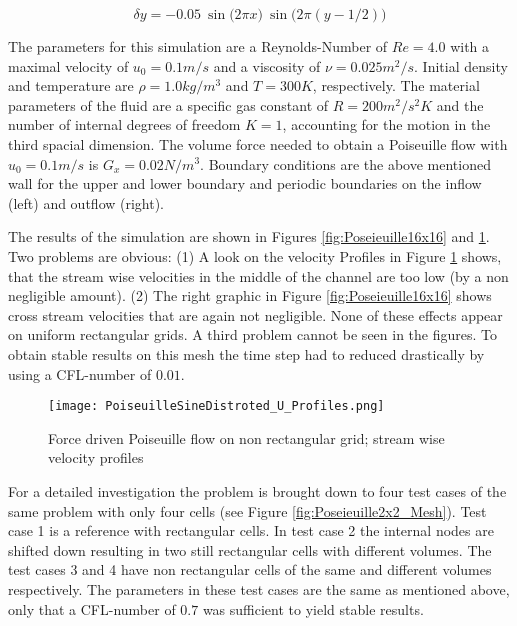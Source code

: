 \documentclass[
	pdftex,             %
	12pt,				%
	a4paper,		   	%
	english,				%
	oneside,			%
]{article}
\begin{document}
\begin{equation}
\delta y = -0.05 ~ \sin \big(2 \pi x \big) ~ \sin \big(2 \pi (y-1/2) \big)
\end{equation}

The parameters for this simulation are a Reynolds-Number of $Re = 4.0$ with a maximal velocity of $u_0 = 0.1 m/s$ and a viscosity of $\nu = 0.025 m^2/s$.
Initial density and temperature are $\rho = 1.0 kg/m^3$ and $T = 300 K$, respectively.
The material parameters of the fluid are a specific gas constant of $R = 200 m^2/s^2K$ and the number of internal degrees of freedom $K = 1$, accounting for the motion in the third spacial dimension.
The volume force needed to obtain a Poiseuille flow with $u_0 = 0.1 m/s$ is $G_x = 0.02 N/m^3$.
Boundary conditions are the above mentioned wall for the upper and lower boundary and periodic boundaries on the inflow (left) and outflow (right).

The results of the simulation are shown in Figures \ref{fig:Poseieuille16x16} and  \ref{fig:Poseieuille16x16_Profiles}.
Two problems are obvious:
(1) A look on the velocity Profiles in Figure \ref{fig:Poseieuille16x16_Profiles} shows, that the stream wise velocities in the middle of the channel are too low (by a non negligible amount).
(2) The right graphic in Figure \ref{fig:Poseieuille16x16} shows cross stream velocities that are again not negligible.
None of these effects appear on uniform rectangular grids.
A third problem cannot be seen in the figures.
To obtain stable results on this mesh the time step had to reduced drastically by using a CFL-number of $0.01$.

\begin{figure}[h!]
\center
\texttt{[image: PoiseuilleSineDistroted\_U\_Profiles.png]}
\caption{Force driven Poiseuille flow on non rectangular grid; stream wise velocity profiles}
\label{fig:Poseieuille16x16_Profiles}
\end{figure}

For a detailed investigation the problem is brought down to four test cases of the same problem with only four cells (see Figure \ref{fig:Poseieuille2x2_Mesh}).
Test case 1 is a reference with rectangular cells.
In test case 2 the internal nodes are shifted down resulting in two still rectangular cells with different volumes.
The test cases 3 and 4 have non rectangular cells of the same and different volumes respectively. The parameters in these test cases are the same as mentioned above, only that a CFL-number of $0.7$ was sufficient to yield stable results.
\end{document}
